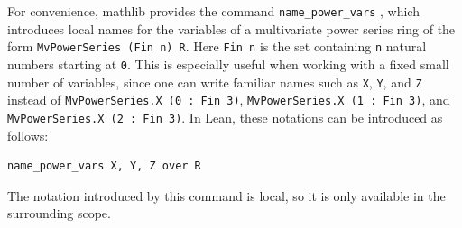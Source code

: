 For convenience, mathlib provides the command \lstinline|name_power_vars|
\href{https://leanprover-community.github.io/mathlib4_docs/Mathlib/Tactic/Ring/NamePowerVars.html#Mathlib.Tactic.elabNamePowerSeriesVariablesOver}{\faExternalLink},
which introduces local names for the variables of a multivariate power
series ring of the form \lstinline|MvPowerSeries (Fin n) R|.  Here
\lstinline|Fin n|
\href{https://leanprover-community.github.io/mathlib4_docs/Init/Prelude.html#Fin}{\faExternalLink} is the set containing \lstinline|n| natural numbers
starting at \lstinline|0|.
This is especially useful when working with a fixed small number of variables,
since one can write familiar names such as \lstinline|X|, \lstinline|Y|,
and \lstinline|Z| instead of \lstinline|MvPowerSeries.X (0 : Fin 3)|,
\lstinline|MvPowerSeries.X (1 : Fin 3)|, and
\lstinline|MvPowerSeries.X (2 : Fin 3)|.
In Lean, these notations can be introduced as follows:
\begin{lstlisting}
name_power_vars X, Y, Z over R
\end{lstlisting}

The notation introduced by this
command is local, so it is only available in the surrounding scope.